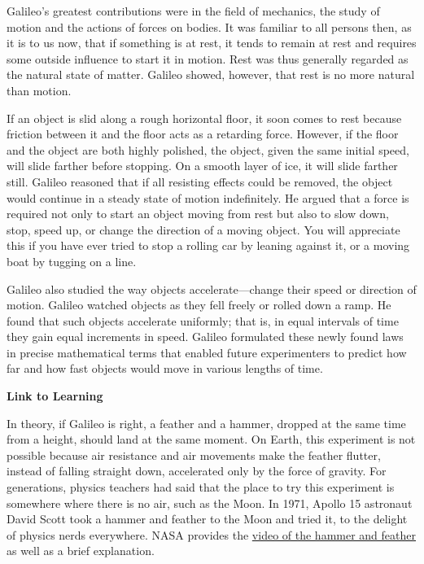 \documentclass[main.tex]{subfiles}
\begin{document}
Galileo's greatest contributions were in the field of mechanics, the study of motion and the actions of forces on bodies. It was familiar to all persons then, as it is to us now, that if something is at rest, it tends to remain at rest and requires some outside influence to start it in motion. Rest was thus generally regarded as the natural state of matter. Galileo showed, however, that rest is no more natural than motion.

\vspace{1em}

If an object is slid along a rough horizontal floor, it soon comes to rest because friction between it and the floor acts as a retarding force. However, if the floor and the object are both highly polished, the object, given the same initial speed, will slide farther before stopping. On a smooth layer of ice, it will slide farther still. Galileo reasoned that if all resisting effects could be removed, the object would continue in a steady state of motion indefinitely. He argued that a force is required not only to start an object moving from rest but also to slow down, stop, speed up, or change the direction of a moving object. You will appreciate this if you have ever tried to stop a rolling car by leaning against it, or a moving boat by tugging on a line.

\vspace{1em}

Galileo also studied the way objects accelerate---change their speed or direction of motion. Galileo watched objects as they fell freely or rolled down a ramp. He found that such objects accelerate uniformly; that is, in equal intervals of time they gain equal increments in speed. Galileo formulated these newly found laws in precise mathematical terms that enabled future experimenters to predict how far and how fast objects would move in various lengths of time.

\begin{mdframed}[backgroundcolor=black!10]
    \textbf{Link to Learning}

    \vspace{1ex}

    In theory, if Galileo is right, a feather and a hammer, dropped at the same time from a height, should land at the same moment. On Earth, this experiment is not possible because air resistance and air movements make the feather flutter, instead of falling straight down, accelerated only by the force of gravity. For generations, physics teachers had said that the place to try this experiment is somewhere where there is no air, such as the Moon. In 1971, Apollo 15 astronaut David Scott took a hammer and feather to the Moon and tried it, to the delight of physics nerds everywhere. NASA provides the \href{https://openstax.org/l/30HamVsFeath}{video of the hammer and feather} as well as a brief explanation.
\end{mdframed}
\end{document}
